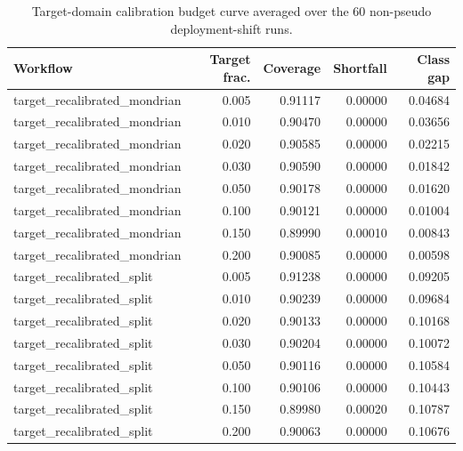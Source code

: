 \begin{table}[t]
\centering
\caption{Target-domain calibration budget curve averaged over the 60 non-pseudo deployment-shift runs.}
\label{tab:target_budget}
\small
\begin{tabular}{lrrrr}
\toprule
Workflow & Target frac. & Coverage & Shortfall & Class gap \\
\midrule
target\_recalibrated\_mondrian & 0.005 & 0.91117 & 0.00000 & 0.04684 \\
target\_recalibrated\_mondrian & 0.010 & 0.90470 & 0.00000 & 0.03656 \\
target\_recalibrated\_mondrian & 0.020 & 0.90585 & 0.00000 & 0.02215 \\
target\_recalibrated\_mondrian & 0.030 & 0.90590 & 0.00000 & 0.01842 \\
target\_recalibrated\_mondrian & 0.050 & 0.90178 & 0.00000 & 0.01620 \\
target\_recalibrated\_mondrian & 0.100 & 0.90121 & 0.00000 & 0.01004 \\
target\_recalibrated\_mondrian & 0.150 & 0.89990 & 0.00010 & 0.00843 \\
target\_recalibrated\_mondrian & 0.200 & 0.90085 & 0.00000 & 0.00598 \\
target\_recalibrated\_split & 0.005 & 0.91238 & 0.00000 & 0.09205 \\
target\_recalibrated\_split & 0.010 & 0.90239 & 0.00000 & 0.09684 \\
target\_recalibrated\_split & 0.020 & 0.90133 & 0.00000 & 0.10168 \\
target\_recalibrated\_split & 0.030 & 0.90204 & 0.00000 & 0.10072 \\
target\_recalibrated\_split & 0.050 & 0.90116 & 0.00000 & 0.10584 \\
target\_recalibrated\_split & 0.100 & 0.90106 & 0.00000 & 0.10443 \\
target\_recalibrated\_split & 0.150 & 0.89980 & 0.00020 & 0.10787 \\
target\_recalibrated\_split & 0.200 & 0.90063 & 0.00000 & 0.10676 \\
\bottomrule
\end{tabular}
\end{table}
